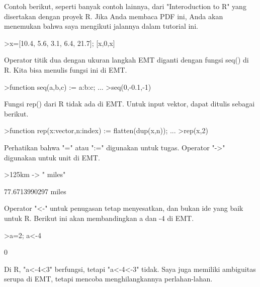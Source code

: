 \documentclass{article}
\begin{document}
\begin{eulernotebook}
\begin{eulercomment}
\begin{eulercomment}
\begin{eulercomment}
Contoh berikut, seperti banyak contoh lainnya, dari "Interoduction to
R" yang disertakan dengan proyek R. Jika Anda membaca PDF ini, Anda
akan menemukan bahwa saya mengikuti jalannya dalam tutorial ini.
\end{eulercomment}
\begin{eulerprompt}
>x=[10.4, 5.6, 3.1, 6.4, 21.7]; [x,0,x]
\end{eulerprompt}
\begin{euleroutput}
  [10.4,  5.6,  3.1,  6.4,  21.7,  0,  10.4,  5.6,  3.1,  6.4,  21.7]
\end{euleroutput}
\begin{eulercomment}
Operator titik dua dengan ukuran langkah EMT diganti dengan fungsi
seq() di R. Kita bisa menulis fungsi ini di EMT.
\end{eulercomment}
\begin{eulerprompt}
>function seq(a,b,c) := a:b:c; ...
>seq(0,-0.1,-1)
\end{eulerprompt}
\begin{euleroutput}
  [0,  -0.1,  -0.2,  -0.3,  -0.4,  -0.5,  -0.6,  -0.7,  -0.8,  -0.9,  -1]
\end{euleroutput}
\begin{eulercomment}
Fungsi rep() dari R tidak ada di EMT. Untuk input vektor, dapat
ditulis sebagai berikut.
\end{eulercomment}
\begin{eulerprompt}
>function rep(x:vector,n:index) := flatten(dup(x,n)); ...
>rep(x,2)
\end{eulerprompt}
\begin{euleroutput}
  [10.4,  5.6,  3.1,  6.4,  21.7,  10.4,  5.6,  3.1,  6.4,  21.7]
\end{euleroutput}
\begin{eulercomment}
Perhatikan bahwa "=" atau ":=" digunakan untuk tugas. Operator "-\textgreater{}"
digunakan untuk unit di EMT.
\end{eulercomment}
\begin{eulerprompt}
>125km -> " miles"
\end{eulerprompt}
\begin{euleroutput}
  77.6713990297 miles
\end{euleroutput}
\begin{eulercomment}
Operator "\textless{}-" untuk penugasan tetap menyesatkan, dan bukan ide yang
baik untuk R. Berikut ini akan membandingkan a dan -4 di EMT.
\end{eulercomment}
\begin{eulerprompt}
>a=2; a<-4
\end{eulerprompt}
\begin{euleroutput}
  0
\end{euleroutput}
\begin{eulercomment}
Di R, "a\textless{}-4\textless{}3" berfungsi, tetapi "a\textless{}-4\textless{}-3" tidak. Saya juga memiliki
ambiguitas serupa di EMT, tetapi mencoba menghilangkannya
perlahan-lahan.


\end{eulercomment}
\end{eulercomment}
\end{eulercomment}
\end{eulernotebook}
\end{document}
